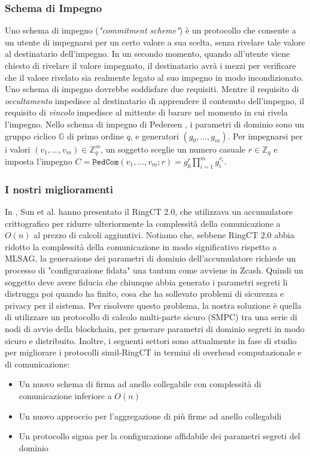 \subsubsection{Schema di Impegno}
Uno schema di impegno (\emph{"commitment scheme"}) è un protocollo che consente a un utente di impegnarsi per un certo valore a sua scelta, senza rivelare tale valore al destinatario dell'impegno. In un secondo momento, quando all'utente viene chiesto di rivelare il valore impegnato, il destinatario avrà i mezzi per verificare che il valore rivelato sia realmente legato al suo impegno in modo incondizionato. Uno schema di impegno dovrebbe soddisfare due requisiti. Mentre il requisito di \emph{occultamento} impedisce al destinatario di apprendere il contenuto dell'impegno,
il requisito di \emph{vincolo} impedisce al mittente di barare nel momento in cui rivela l'impegno. Nello schema di impegno di Pedersen \cite{c23}, i parametri di dominio sono un gruppo ciclico $\mathds{G}$ di primo ordine $q$, e generatori $(g_0,..., g_m)$. Per impegnarsi per i valori $(v_1,..., v_m) \in \mathds{Z}^m_q$, un soggetto sceglie un numero casuale $r \in \mathds{Z}_q$ e imposta l'impegno
$C = \texttt{PedCom}(v_1,..., v_m; r) = g^r_0\prod^m_{i=1}g^{v_i}_i$.


\subsubsection{I nostri miglioramenti}
In \cite{c31}, Sun et al. hanno presentato il RingCT 2.0, che utilizzava un accumulatore crittografico per ridurre ulteriormente la complessità della comunicazione a $O(n)$ al prezzo di calcoli aggiuntivi. Notiamo che, sebbene RingCT 2.0 abbia ridotto la complessità della comunicazione in modo significativo rispetto a MLSAG, la generazione dei parametri di dominio dell'accumulatore richiede un processo di "configurazione fidata" una tantum come avviene in Zcash. Quindi un soggetto deve avere fiducia che chiunque abbia generato i parametri segreti li distrugga poi quando ha finito, cosa che ha sollevato problemi di sicurezza e privacy per il sistema. Per risolvere
questo problema, la nostra soluzione è quella di utilizzare un protocollo di calcolo multi-parte sicuro (SMPC) tra una serie di nodi di avvio della blockchain, per generare parametri di dominio segreti in modo sicuro e distribuito. Inoltre, i seguenti settori sono attualmente in fase di studio per migliorare i protocolli simil-RingCT in termini di overhead computazionale e di comunicazione:

\begin{itemize}
	\item Un nuovo schema di firma ad anello collegabile con complessità di comunicazione inferiore a $O(n)$
	\item Un nuovo approccio per l'aggregazione di più firme ad anello collegabili
	\item Un protocollo sigma per la configurazione affidabile dei parametri segreti del dominio
\end{itemize}

